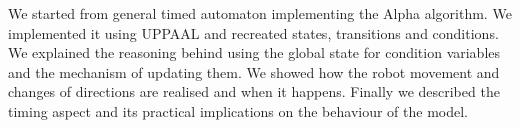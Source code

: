 We started from general timed automaton implementing the Alpha algorithm. We implemented it using UPPAAL and recreated states, transitions and conditions. We explained the reasoning behind using the global state for condition variables and the mechanism of updating them. We showed how the robot movement and changes of directions are realised and when it happens. Finally we described the timing aspect and its practical implications on the behaviour of the model.